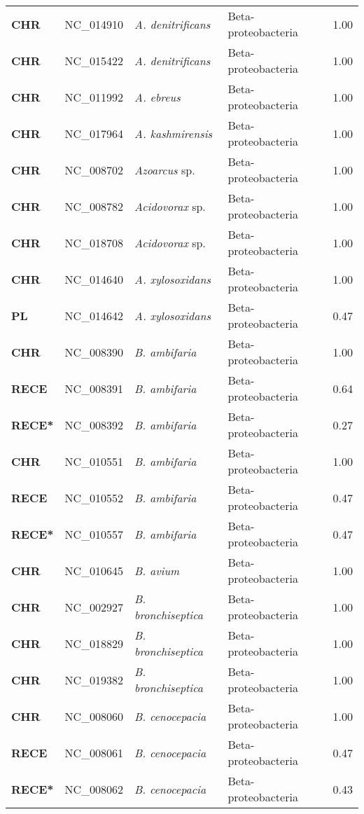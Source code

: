 \begin{adjustwidth}{-3cm}{2cm}
{\begin{supertabular}{>{\bfseries}l|p{0.1\textwidth}p{0.14\textwidth}l|l}
CHR & NC\_014910 & \textit{A. denitrificans} & Beta-proteobacteria & 1.00\\
CHR & NC\_015422 & \textit{A. denitrificans} & Beta-proteobacteria & 1.00\\
CHR & NC\_011992 & \textit{A. ebreus} & Beta-proteobacteria & 1.00\\
CHR & NC\_017964 & \textit{A. kashmirensis} & Beta-proteobacteria & 1.00\\
CHR & NC\_008702 & \textit{Azoarcus} sp. & Beta-proteobacteria & 1.00\\
CHR & NC\_008782 & \textit{Acidovorax} sp. & Beta-proteobacteria & 1.00\\
CHR & NC\_018708 & \textit{Acidovorax} sp. & Beta-proteobacteria & 1.00\\
CHR & NC\_014640 & \textit{A. xylosoxidans} & Beta-proteobacteria & 1.00\\
PL & NC\_014642 & \textit{A. xylosoxidans} & Beta-proteobacteria & 0.47\\
CHR & NC\_008390 & \textit{B. ambifaria} & Beta-proteobacteria & 1.00\\
RECE & NC\_008391 & \textit{B. ambifaria} & Beta-proteobacteria & 0.64\\
RECE* & NC\_008392 & \textit{B. ambifaria} & Beta-proteobacteria & 0.27\\
CHR & NC\_010551 & \textit{B. ambifaria} & Beta-proteobacteria & 1.00\\
RECE & NC\_010552 & \textit{B. ambifaria} & Beta-proteobacteria & 0.47\\
RECE* & NC\_010557 & \textit{B. ambifaria} & Beta-proteobacteria & 0.47\\
CHR & NC\_010645 & \textit{B. avium} & Beta-proteobacteria & 1.00\\
CHR & NC\_002927 & \textit{B. bronchiseptica} & Beta-proteobacteria & 1.00\\
CHR & NC\_018829 & \textit{B. bronchiseptica} & Beta-proteobacteria & 1.00\\
CHR & NC\_019382 & \textit{B. bronchiseptica} & Beta-proteobacteria & 1.00\\
CHR & NC\_008060 & \textit{B. cenocepacia} & Beta-proteobacteria & 1.00\\
RECE & NC\_008061 & \textit{B. cenocepacia} & Beta-proteobacteria & 0.47\\
RECE* & NC\_008062 & \textit{B. cenocepacia} & Beta-proteobacteria & 0.43\\

\end{supertabular}}
\end{adjustwidth}

